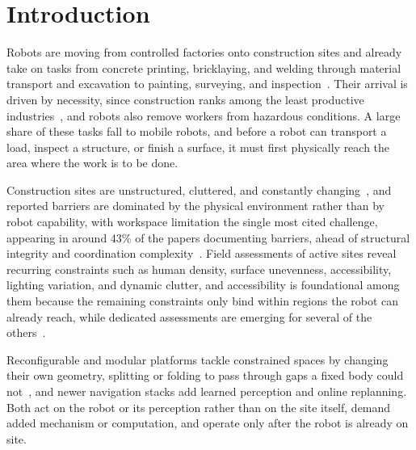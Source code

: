 \documentclass[a4paper, 10pt, conference]{ieeeconf}
\begin{document}
\section{Introduction}
Robots are moving from controlled factories onto construction sites and already take on tasks from concrete printing, bricklaying, and welding through material transport and excavation to painting, surveying, and inspection~\cite{Gharbia2020-ml,Xu2026-cr}. Their arrival is driven by necessity, since construction ranks among the least productive industries~\cite{Rathnayake2023-xt}, and robots also remove workers from hazardous conditions. A large share of these tasks fall to mobile robots, and before a robot can transport a load, inspect a structure, or finish a surface, it must first physically reach the area where the work is to be done.

Construction sites are unstructured, cluttered, and constantly changing~\cite{Xu2026-cr}, and reported barriers are dominated by the physical environment rather than by robot capability, with workspace limitation the single most cited challenge, appearing in around 43\% of the papers documenting barriers, ahead of structural integrity and coordination complexity~\cite{Gharbia2020-ml}. Field assessments of active sites reveal recurring constraints such as human density, surface unevenness, accessibility, lighting variation, and dynamic clutter, and accessibility is foundational among them because the remaining constraints only bind within regions the robot can already reach, while dedicated assessments are emerging for several of the others~\cite{zeng2024riilux,borusu2024rilsu}.

Reconfigurable and modular platforms tackle constrained spaces by changing their own geometry, splitting or folding to pass through gaps a fixed body could not~\cite{CONCERT,9817632,sachinthana2025energy}, and newer navigation stacks add learned perception and online replanning. Both act on the robot or its perception rather than on the site itself, demand added mechanism or computation, and operate only after the robot is already on site.
\end{document}

